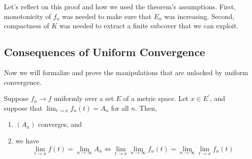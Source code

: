   Let's reflect on this proof and how we used the theorem's assumptions. First, monotonicity of $f_n$ was needed to make sure that $E_n$ was increasing. Second, compactness of $K$ was needed to extract a finite subcover that we can exploit. 

\subsection{Consequences of Uniform Convergence} 

  Now we will formalize and prove the manipulations that are unlocked by uniform convergence. 

  \begin{theorem}
    \label{thm:limits-are-swappable}
    Suppose $f_n \to f$ uniformly over a set $E$ of a metric space. Let $x \in E^\prime$, and suppose that $\lim_{t \to x} f_n (t) = A_n$ for all $n$. Then, 
    \begin{enumerate}
      \item $(A_n)$ converges, and 
      \item we have 
        \begin{equation}
          \lim_{t \to x} f(t) = \lim_{n \to \infty} A_n \iff \lim_{t \to x} \lim_{n \to \infty} f_n (t) = \lim_{n \to \infty} \lim_{t \to x} f_n (t)
        \end{equation}
    \end{enumerate}
  \end{theorem}
